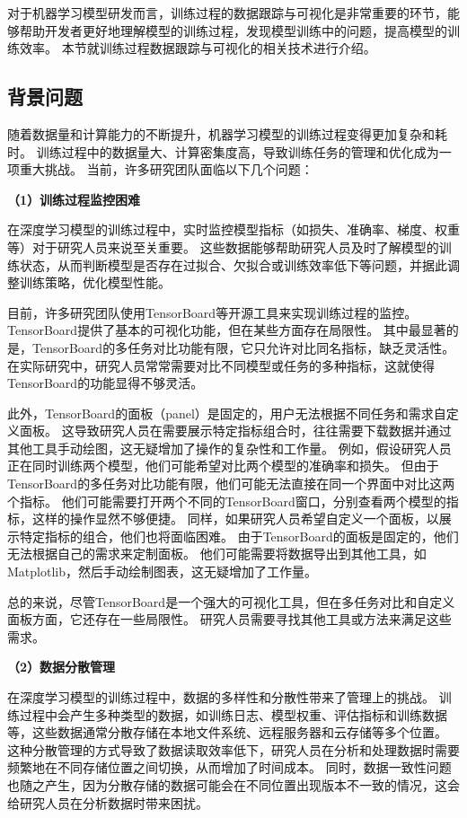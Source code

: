 对于机器学习模型研发而言，训练过程的数据跟踪与可视化是非常重要的环节，能够帮助开发者更好地理解模型的训练过程，发现模型训练中的问题，提高模型的训练效率。
本节就训练过程数据跟踪与可视化的相关技术进行介绍。

\subsection{背景问题}

随着数据量和计算能力的不断提升，机器学习模型的训练过程变得更加复杂和耗时。
训练过程中的数据量大、计算密集度高，导致训练任务的管理和优化成为一项重大挑战。
当前，许多研究团队面临以下几个问题：

\textbf{（1）训练过程监控困难}

在深度学习模型的训练过程中，实时监控模型指标（如损失、准确率、梯度、权重等）对于研究人员来说至关重要。
这些数据能够帮助研究人员及时了解模型的训练状态，从而判断模型是否存在过拟合、欠拟合或训练效率低下等问题，并据此调整训练策略，优化模型性能。

目前，许多研究团队使用TensorBoard等开源工具来实现训练过程的监控。
TensorBoard提供了基本的可视化功能，但在某些方面存在局限性。
其中最显著的是，TensorBoard的多任务对比功能有限，它只允许对比同名指标，缺乏灵活性。
在实际研究中，研究人员常常需要对比不同模型或任务的多种指标，这就使得TensorBoard的功能显得不够灵活。

此外，TensorBoard的面板（panel）是固定的，用户无法根据不同任务和需求自定义面板。
这导致研究人员在需要展示特定指标组合时，往往需要下载数据并通过其他工具手动绘图，这无疑增加了操作的复杂性和工作量。
例如，假设研究人员正在同时训练两个模型，他们可能希望对比两个模型的准确率和损失。
但由于TensorBoard的多任务对比功能有限，他们可能无法直接在同一个界面中对比这两个指标。
他们可能需要打开两个不同的TensorBoard窗口，分别查看两个模型的指标，这样的操作显然不够便捷。
同样，如果研究人员希望自定义一个面板，以展示特定指标的组合，他们也将面临困难。
由于TensorBoard的面板是固定的，他们无法根据自己的需求来定制面板。
他们可能需要将数据导出到其他工具，如Matplotlib，然后手动绘制图表，这无疑增加了工作量。

总的来说，尽管TensorBoard是一个强大的可视化工具，但在多任务对比和自定义面板方面，它还存在一些局限性。
研究人员需要寻找其他工具或方法来满足这些需求。

\textbf{（2）数据分散管理}

在深度学习模型的训练过程中，数据的多样性和分散性带来了管理上的挑战。
训练过程中会产生多种类型的数据，如训练日志、模型权重、评估指标和训练数据等，这些数据通常分散存储在本地文件系统、远程服务器和云存储等多个位置。
这种分散管理的方式导致了数据读取效率低下，研究人员在分析和处理数据时需要频繁地在不同存储位置之间切换，从而增加了时间成本。
同时，数据一致性问题也随之产生，因为分散存储的数据可能会在不同位置出现版本不一致的情况，这会给研究人员在分析数据时带来困扰。


